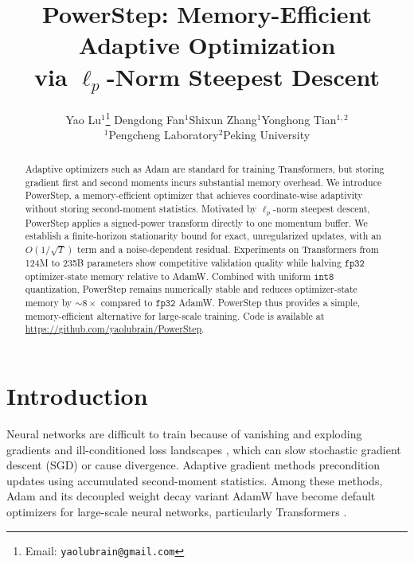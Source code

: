 \documentclass{article}
\title{PowerStep: Memory-Efficient Adaptive Optimization\\via $\ell_p$-Norm Steepest Descent}
\author{%
Yao Lu$^1$\thanks{Email: \texttt{yaolubrain@gmail.com}}\quad
Dengdong Fan$^1$\quad Shixun Zhang$^1$\quad Yonghong Tian$^{1,2}$\\
$^1$Pengcheng Laboratory\qquad $^2$Peking University
}
\begin{document}
\maketitle
\begin{abstract}
Adaptive optimizers such as Adam are standard for training Transformers, but storing gradient first and second moments incurs substantial memory overhead. We introduce PowerStep, a memory-efficient optimizer that achieves coordinate-wise adaptivity without storing second-moment statistics. Motivated by $\ell_p$-norm steepest descent, PowerStep applies a signed-power transform directly to one momentum buffer. We establish a finite-horizon stationarity bound for exact, unregularized updates, with an $O(1/\sqrt{T})$ term and a noise-dependent residual. Experiments on Transformers from 124M to 235B parameters show competitive validation quality while halving $\texttt{fp32}$ optimizer-state memory relative to AdamW. Combined with uniform $\texttt{int8}$ quantization, PowerStep remains numerically stable and reduces optimizer-state memory by $\sim8\times$ compared to $\texttt{fp32}$ AdamW. PowerStep thus provides a simple, memory-efficient alternative for large-scale training. Code is available at \url{https://github.com/yaolubrain/PowerStep}.
\end{abstract}

\section{Introduction}

Neural networks are difficult to train because of vanishing and exploding gradients \citep{hochreiter1991untersuchungen,bengio1994learning} and ill-conditioned loss landscapes \citep{lecun1998efficient,dauphin2014identifying,choromanska2015loss}, which can slow stochastic gradient descent (SGD) or cause divergence. Adaptive gradient methods \citep{duchi2011adaptive,tieleman2012rmsprop,kingma2015adam,loshchilov2019decoupled} precondition updates using accumulated second-moment statistics. Among these methods, Adam and its decoupled weight decay variant AdamW have become default optimizers for large-scale neural networks, particularly Transformers \citep{vaswani2017attention}.
\end{document}
